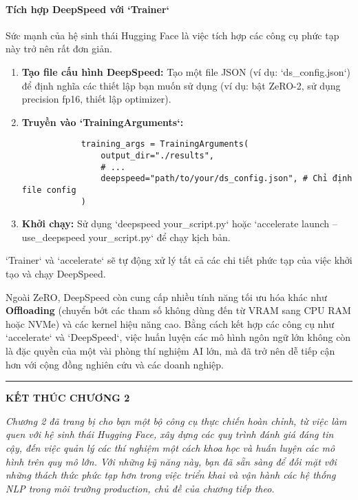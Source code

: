 \paragraph{Tích hợp DeepSpeed với `Trainer`}
Sức mạnh của hệ sinh thái Hugging Face là việc tích hợp các công cụ phức tạp này trở nên rất đơn giản.
\begin{enumerate}
    \item \textbf{Tạo file cấu hình DeepSpeed:} Tạo một file JSON (ví dụ: `ds\_config.json`) để định nghĩa các thiết lập bạn muốn sử dụng (ví dụ: bật ZeRO-2, sử dụng precision fp16, thiết lập optimizer).
    \item \textbf{Truyền vào `TrainingArguments`:}
        \begin{tcolorbox}[title=Cấu hình DeepSpeed, colback=black!5!white, colframe=black!80!white]
            \begin{verbatim}
            training_args = TrainingArguments(
                output_dir="./results",
                # ...
                deepspeed="path/to/your/ds_config.json", # Chỉ định file config
            )
            \end{verbatim}
        \end{tcolorbox}
    \item \textbf{Khởi chạy:} Sử dụng `deepspeed your\_script.py` hoặc `accelerate launch --use\_deepspeed your\_script.py` để chạy kịch bản.
\end{enumerate}
`Trainer` và `accelerate` sẽ tự động xử lý tất cả các chi tiết phức tạp của việc khởi tạo và chạy DeepSpeed.

Ngoài ZeRO, DeepSpeed còn cung cấp nhiều tính năng tối ưu hóa khác như \textbf{Offloading} (chuyển bớt các tham số không dùng đến từ VRAM sang CPU RAM hoặc NVMe) và các kernel hiệu năng cao. Bằng cách kết hợp các công cụ như `accelerate` và `DeepSpeed`, việc huấn luyện các mô hình ngôn ngữ lớn không còn là đặc quyền của một vài phòng thí nghiệm AI lớn, mà đã trở nên dễ tiếp cận hơn với cộng đồng nghiên cứu và các doanh nghiệp.

\bigskip
\hrule
\bigskip

\begin{center}
    \textbf{\Large KẾT THÚC CHƯƠNG 2}
\end{center}

\textit{Chương 2 đã trang bị cho bạn một bộ công cụ thực chiến hoàn chỉnh, từ việc làm quen với hệ sinh thái Hugging Face, xây dựng các quy trình đánh giá đáng tin cậy, đến việc quản lý các thí nghiệm một cách khoa học và huấn luyện các mô hình trên quy mô lớn. Với những kỹ năng này, bạn đã sẵn sàng để đối mặt với những thách thức phức tạp hơn trong việc triển khai và vận hành các hệ thống NLP trong môi trường production, chủ đề của chương tiếp theo.}